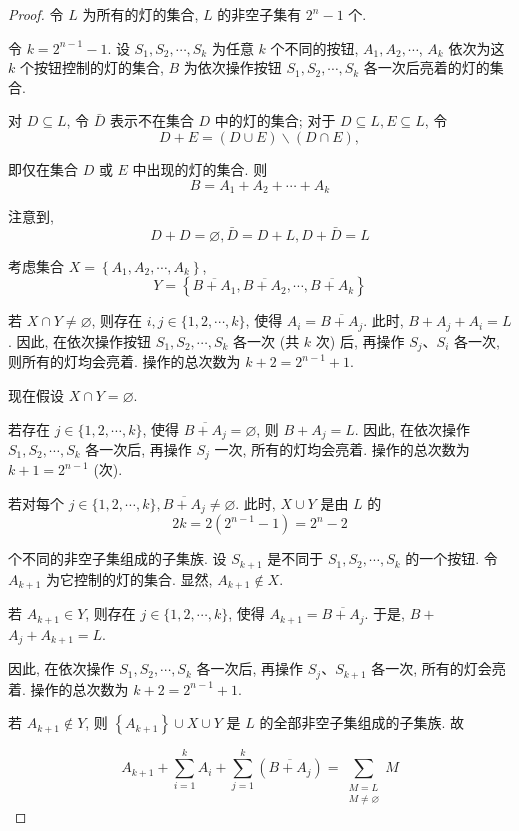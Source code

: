 \begin{proof}
	令 $L$ 为所有的灯的集合, $L$ 的非空子集有 $2^{n}-1$ 个.

	令 $k=2^{n-1}-1$. 设 $S_{1}, S_{2}, \cdots, S_{k}$ 为任意 $k$ 个不同的按钮, $A_{1}, A_{2}, \cdots$, $A_{k}$ 依次为这 $k$ 个按钮控制的灯的集合, $B$ 为依次操作按钮 $S_{1}, S_{2}, \cdots, S_{k}$ 各一次后亮着的灯的集合.

	对 $D \subseteq L$, 令 $\bar{D}$ 表示不在集合 $D$ 中的灯的集合; 对于 $D \subseteq L, E \subseteq L$, 令
	$$
		D+E=(D \cup E) \backslash(D \cap E),
	$$

	即仅在集合 $D$ 或 $E$ 中出现的灯的集合. 则
	$$
		B=A_{1}+A_{2}+\cdots+A_{k}
	$$

	注意到,
	$$
		D+D=\varnothing, \bar{D}=D+L, D+\bar{D}=L
	$$

	考虑集合 $X=\left\{A_{1}, A_{2}, \cdots, A_{k}\right\}$,
	$$
		Y=\left\{\overline{B+A_{1}}, \overline{B+A_{2}}, \cdots, \overline{B+A_{k}}\right\}
	$$

	若 $X \cap Y \neq \varnothing$, 则存在 $i, j \in\{1,2, \cdots, k\}$, 使得 $A_{i}=\overline{B+A_{j}}$. 此时, $B+A_{j}+A_{i}=L$. 因此, 在依次操作按钮 $S_{1}, S_{2}, \cdots, S_{k}$ 各一次 (共 $k$ 次) 后, 再操作 $S_{j} 、 S_{i}$ 各一次, 则所有的灯均会亮着. 操作的总次数为 $k+2=2^{n-1}+1$.

	现在假设 $X \cap Y=\varnothing$.

	若存在 $j \in\{1,2, \cdots, k\}$, 使得 $\overline{B+A_{j}}=\varnothing$, 则 $B+A_{j}=L$. 因此, 在依次操作 $S_{1}, S_{2}, \cdots, S_{k}$ 各一次后, 再操作 $S_{j}$ 一次, 所有的灯均会亮着. 操作的总次数为 $k+1=2^{n-1}$ (次).

	若对每个 $j \in\{1,2, \cdots, k\}, \overline{B+A_{j}} \neq \varnothing$. 此时, $X \cup Y$ 是由 $L$ 的
	$$
		2 k=2\left(2^{n-1}-1\right)=2^{n}-2
	$$

	个不同的非空子集组成的子集族. 设 $S_{k+1}$ 是不同于 $S_{1}, S_{2}, \cdots, S_{k}$ 的一个按钮. 令 $A_{k+1}$ 为它控制的灯的集合. 显然, $A_{k+1} \notin X$.

	若 $A_{k+1} \in Y$, 则存在 $j \in\{1,2, \cdots, k\}$, 使得 $A_{k+1}=\overline{B+A_{j}}$. 于是, $B+$ $A_{j}+A_{k+1}=L$.

	因此, 在依次操作 $S_{1}, S_{2}, \cdots, S_{k}$ 各一次后, 再操作 $S_{j} 、 S_{k+1}$ 各一次, 所有的灯会亮着. 操作的总次数为 $k+2=2^{n-1}+1$.

	若 $A_{k+1} \notin Y$, 则 $\left\{A_{k+1}\right\} \cup X \cup Y$ 是 $L$ 的全部非空子集组成的子集族. 故


	\begin{equation*}
		A_{k+1}+\sum_{i=1}^{k} A_{i}+\sum_{j=1}^{k}\left(\overline{B+A_{j}}\right)=\sum_{\substack{M=L \\ M \neq \varnothing}} M \tag{1}
	\end{equation*}



\end{proof}
